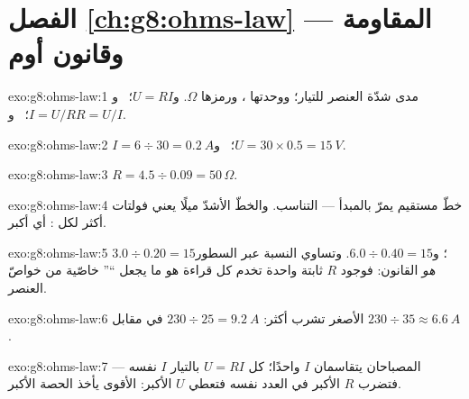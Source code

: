 \section*{الفصل \ref{ch:g8:ohms-law} --- المقاومة وقانون أوم}

\begin{solution}{exo:g8:ohms-law:1}
مدى شدّة  العنصر للتيار؛ ووحدتها ، ورمزها $\Omega$.
و$U = R I$؛ \ و$I = U/R$؛ \ و$R = U/I$.
\end{solution}

\begin{solution}{exo:g8:ohms-law:2}
$I = 6 \div 30 = \qty{0.2}{A}$؛ \ و$U = 30 \times 0.5 =
\qty{15}{V}$.
\end{solution}

\begin{solution}{exo:g8:ohms-law:3}
$R = 4.5 \div 0.09 = 50\,\Omega$.
\end{solution}

\begin{solution}{exo:g8:ohms-law:4}
خطّ مستقيم يمرّ بالمبدأ --- التناسب. والخطّ الأشدّ ميلًا يعني
فولتات أكثر لكل : أي  أكبر.
\end{solution}

\begin{solution}{exo:g8:ohms-law:5}
$3.0 \div 0.20 = 15$؛ و$6.0 \div 0.40 = 15$. وتساوي النسبة عبر
السطور \emph{هو} القانون: فوجود $R$ ثابتة واحدة تخدم كل قراءة
هو ما يجعل ``'' خاصّية من خواصّ العنصر.
\end{solution}

\begin{solution}{exo:g8:ohms-law:6}
 الأصغر تشرب أكثر: $230 \div 25 = \qty{9.2}{A}$ في
مقابل $230 \div 35 \approx \qty{6.6}{A}$.
\end{solution}

\begin{solution}{exo:g8:ohms-law:7}
المصباحان  يتقاسمان $I$ واحدًا؛  كل 
$U = R I$ بالتيار $I$ نفسه --- فتضرب $R$ الأكبر في العدد نفسه فتعطي
$U$ الأكبر:  الأقوى يأخذ الحصة الأكبر.
\end{solution}

